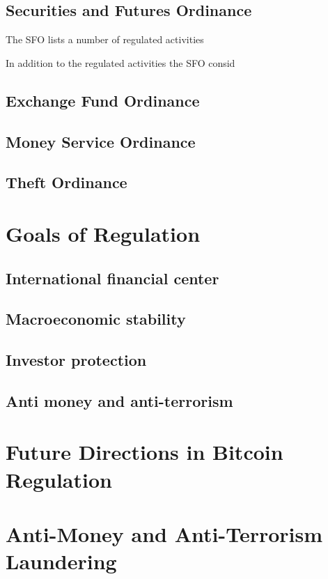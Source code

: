 \subsection{Securities and Futures Ordinance}

The SFO lists a number of regulated activities

In addition to the regulated activities the SFO consid

\subsection{Exchange Fund Ordinance}
\subsection{Money Service Ordinance}


\subsection{Theft Ordinance}

\section{Goals of Regulation}

\subsection{International financial center}

\subsection{Macroeconomic stability}

\subsection{Investor protection}

\subsection{Anti money and anti-terrorism}

\section{Future Directions in Bitcoin Regulation}

\section{Anti-Money and Anti-Terrorism Laundering}


